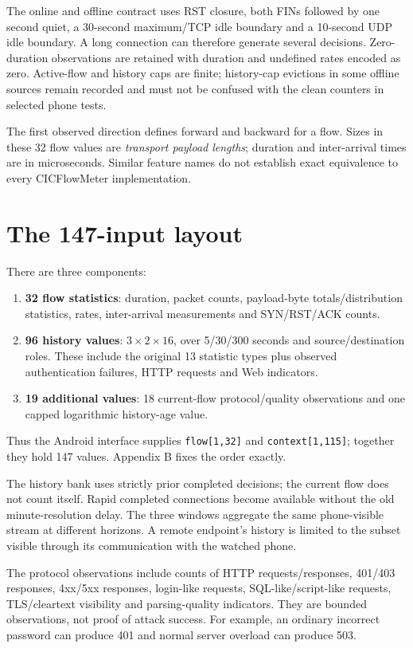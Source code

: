 \documentclass[11pt,a4paper,oneside]{report}
\newcommand{\code}[1]{\nolinkurl{#1}}
\begin{document}
The online and offline contract uses RST closure, both FINs followed by one second quiet, a 30-second maximum/TCP idle boundary and a 10-second UDP idle boundary. A long connection can therefore generate several decisions. Zero-duration observations are retained with duration and undefined rates encoded as zero. Active-flow and history caps are finite; history-cap evictions in some offline sources remain recorded and must not be confused with the clean counters in selected phone tests.

The first observed direction defines forward and backward for a flow. Sizes in these 32 flow values are \emph{transport payload lengths}; duration and inter-arrival times are in microseconds. Similar feature names do not establish exact equivalence to every CICFlowMeter implementation.

\section{The 147-input layout}
There are three components:
\begin{enumerate}
\item \textbf{32 flow statistics}: duration, packet counts, payload-byte totals/distribution statistics, rates, inter-arrival measurements and SYN/RST/ACK counts.
\item \textbf{96 history values}: $3\times2\times16$, over 5/30/300 seconds and source/destination roles. These include the original 13 statistic types plus observed authentication failures, HTTP requests and Web indicators.
\item \textbf{19 additional values}: 18 current-flow protocol/quality observations and one capped logarithmic history-age value.
\end{enumerate}
Thus the Android interface supplies \code{flow[1,32]} and \code{context[1,115]}; together they hold 147 values. Appendix B fixes the order exactly.

The history bank uses strictly prior completed decisions; the current flow does not count itself. Rapid completed connections become available without the old minute-resolution delay. The three windows aggregate the same phone-visible stream at different horizons. A remote endpoint's history is limited to the subset visible through its communication with the watched phone.

The protocol observations include counts of HTTP requests/responses, 401/403 responses, 4xx/5xx responses, login-like requests, SQL-like/script-like requests, TLS/cleartext visibility and parsing-quality indicators. They are bounded observations, not proof of attack success. For example, an ordinary incorrect password can produce 401 and normal server overload can produce 503.
\end{document}
